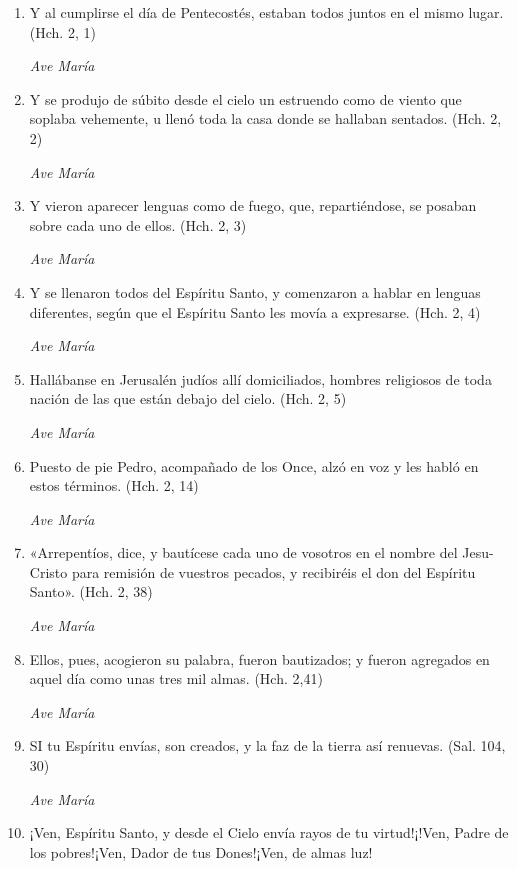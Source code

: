 \documentclass[a4paper,11pt, oneside]{report}
\begin{document}
        \begin{enumerate}

          \item Y al cumplirse el día de Pentecostés, estaban todos juntos en el mismo lugar. (Hch. 2, 1)

          \textit{Ave María}

          \item Y se produjo de súbito desde el cielo un estruendo como de viento que soplaba vehemente, u llenó toda la casa
          donde se hallaban sentados. (Hch. 2, 2)

          \textit{Ave María}

          \item Y vieron aparecer lenguas como de fuego, que, repartiéndose, se posaban sobre cada uno de ellos. (Hch. 2, 3)

          \textit{Ave María}

          \item Y se llenaron todos del Espíritu Santo, y comenzaron a hablar en lenguas diferentes, según que el Espíritu Santo les movía
          a expresarse. (Hch. 2, 4)

          \textit{Ave María}

          \item Hallábanse en Jerusalén judíos allí domiciliados, hombres religiosos de toda nación de las que están debajo del cielo. (Hch. 2, 5)

          \textit{Ave María}

          \item Puesto de pie Pedro, acompañado de los Once, alzó en voz y les habló en estos términos. (Hch. 2, 14)

          \textit{Ave María}

          \item «Arrepentíos, dice, y bautícese cada uno de vosotros en el nombre del Jesu-Cristo para remisión de vuestros pecados, y recibiréis el don
          del Espíritu Santo». (Hch. 2, 38)

          \textit{Ave María}

          \item Ellos, pues, acogieron su palabra, fueron bautizados; y fueron agregados en aquel día como unas tres mil almas. (Hch. 2,41)

          \textit{Ave María}

          \item SI tu Espíritu envías, son creados, y la faz de la tierra así renuevas. (Sal. 104, 30)

          \textit{Ave María}

          \item ¡Ven, Espíritu Santo, y desde el Cielo envía rayos de tu virtud!¡!Ven, Padre de los pobres!¡Ven, Dador de tus Dones!¡Ven, de almas luz!
          
        \end{enumerate}
\end{document}
